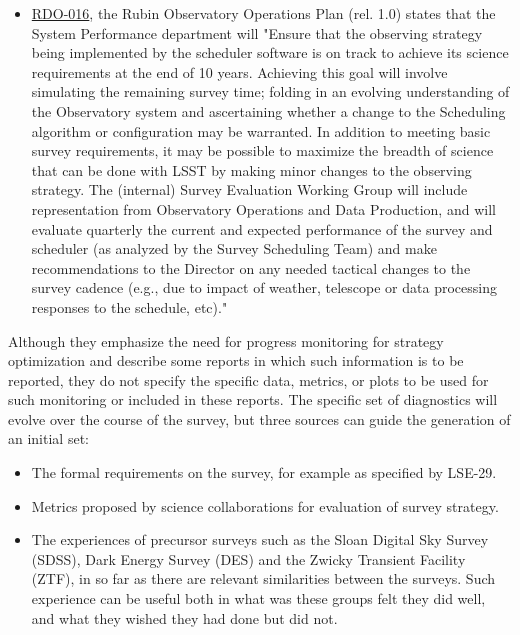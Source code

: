 \begin{itemize}
\item \href{https://ls.st/rdo-016}{RDO-016}, the Rubin Observatory Operations Plan (rel. 1.0) states that the System Performance department will "Ensure that the observing strategy being implemented by the scheduler software is on track to achieve its science requirements at the end of 10 years. Achieving this goal will involve simulating the remaining survey time; folding in an evolving understanding of the Observatory system and ascertaining whether a change to the Scheduling algorithm or configuration may be warranted. In addition to meeting basic survey requirements, it may be possible to maximize the breadth of science that can be done with LSST by making minor changes to the observing strategy. The (internal) Survey Evaluation Working Group will include representation from Observatory Operations and Data Production, and will evaluate quarterly the current and expected performance of the survey and scheduler (as analyzed by the Survey Scheduling Team) and make recommendations to the Director on any needed tactical changes to the survey cadence (e.g., due to impact of weather, telescope or data processing responses to the schedule, etc)."
\end{itemize}

Although they emphasize the need for progress monitoring for strategy optimization and describe some reports in which such information is to be reported, they do not specify the specific data, metrics, or plots to be used for such monitoring or included in these reports.
The specific set of diagnostics will evolve over the course of the survey, but three sources can guide the generation of an initial set:
\begin{itemize}
\item The formal requirements on the survey, for example as specified by LSE-29.
\item Metrics proposed by science collaborations for evaluation of survey strategy.
\item The experiences of precursor surveys such as the Sloan Digital Sky Survey (SDSS), Dark Energy Survey (DES) and the Zwicky Transient Facility (ZTF), in so far as there are relevant similarities between the surveys. Such experience can be useful both in what was these groups felt they did well, and what they wished they had done but did not.
\end{itemize}

